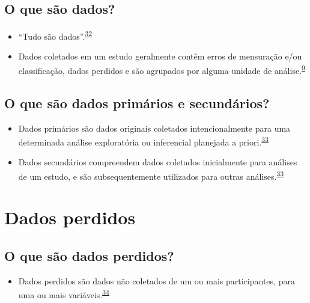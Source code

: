 \documentclass[
  a4paper,
]{book}
\providecommand{\tightlist}{%
  \setlength{\itemsep}{0pt}\setlength{\parskip}{0pt}}
\begin{document}
\hypertarget{o-que-suxe3o-dados}{%
\subsection{O que são dados?}\label{o-que-suxe3o-dados}}

\begin{itemize}
\item
  ``Tudo são dados''.\textsuperscript{\protect\hyperlink{ref-Olson2021}{32}}
\item
  Dados coletados em um estudo geralmente contêm erros de mensuração e/ou classificação, dados perdidos e são agrupados por alguma unidade de análise.\textsuperscript{\protect\hyperlink{ref-van2022a}{9}}
\end{itemize}

\hypertarget{o-que-suxe3o-dados-primuxe1rios-e-secunduxe1rios}{%
\subsection{O que são dados primários e secundários?}\label{o-que-suxe3o-dados-primuxe1rios-e-secunduxe1rios}}

\begin{itemize}
\item
  Dados primários são dados originais coletados intencionalmente para uma determinada análise exploratória ou inferencial planejada a priori.\textsuperscript{\protect\hyperlink{ref-vetter2017}{33}}
\item
  Dados secundários compreendem dados coletados inicialmente para análises de um estudo, e são subsequentemente utilizados para outras análises.\textsuperscript{\protect\hyperlink{ref-vetter2017}{33}}
\end{itemize}

\hypertarget{dados-perdidos}{%
\section{Dados perdidos}\label{dados-perdidos}}

\hypertarget{o-que-suxe3o-dados-perdidos}{%
\subsection{O que são dados perdidos?}\label{o-que-suxe3o-dados-perdidos}}

\begin{itemize}
\tightlist
\item
  Dados perdidos são dados não coletados de um ou mais participantes, para uma ou mais variáveis.\textsuperscript{\protect\hyperlink{ref-Altman2007}{34}}
\end{itemize}
\end{document}
